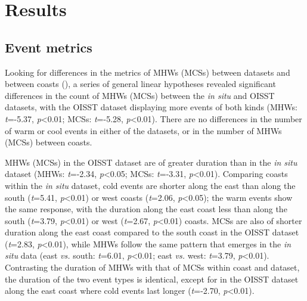 \documentclass[a4paper,10pt,review]{elsarticle}
\begin{document}
\section{Results}

\subsection{Event metrics}
Looking for differences in the metrics of MHWs (MCSs) between datasets and between coasts (), a series of general linear hypotheses \citep{Hothorn2008} revealed significant differences in the count of MHWs (MCSs) between the \emph{in situ} and OISST datasets, with the OISST dataset displaying more events of both kinds (MHWs: \emph{t}=-5.37, \emph{p}<0.01; MCSs: \emph{t}=-5.28, \emph{p}<0.01). There are no differences in the number of warm or cool events in either of the datasets, or in the number of MHWs (MCSs) between coasts.

MHWs (MCSs) in the OISST dataset are of greater duration than in the \emph{in situ} dataset (MHWs: \emph{t}=-2.34, \emph{p}<0.05; MCSs: \emph{t}=-3.31, \emph{p}<0.01). Comparing coasts within the \emph{in situ} dataset, cold events are shorter along the east than along the south (\emph{t}=5.41, \emph{p}<0.01) or west coasts (\emph{t}=2.06, \emph{p}<0.05); the warm events show the same response, with the duration along the east coast less than along the south (\emph{t}=3.79, \emph{p}<0.01) or west (\emph{t}=2.67, \emph{p}<0.01) coasts. MCSs are also of shorter duration along the east coast compared to the south coast in the OISST dataset (\emph{t}=2.83, \emph{p}<0.01), while MHWs follow the same pattern that emerges in the \emph{in situ} data (east \emph{vs.} south: \emph{t}=6.01, \emph{p}<0.01; east \emph{vs.} west: \emph{t}=3.79, \emph{p}<0.01). Contrasting the duration of MHWs with that of MCSs within coast and dataset, the duration of the two event types is identical, except for in the OISST dataset along the east coast where cold events last longer (\emph{t}=-2.70, \emph{p}<0.01).
\end{document}
